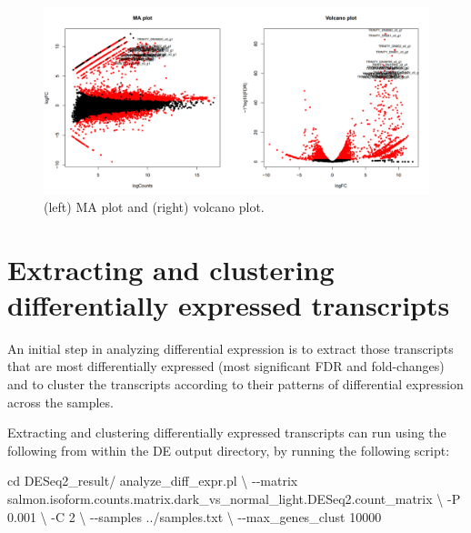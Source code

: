 \documentclass[
  letterpaper,
  DIV=11,
  numbers=noendperiod]{scrreprt}
\newenvironment{Shaded}{\begin{snugshade}}{\end{snugshade}}
\newcommand{\BuiltInTok}[1]{\textcolor[rgb]{0.00,0.23,0.31}{#1}}
\newcommand{\DataTypeTok}[1]{\textcolor[rgb]{0.68,0.00,0.00}{#1}}
\newcommand{\ExtensionTok}[1]{\textcolor[rgb]{0.00,0.23,0.31}{#1}}
\newcommand{\NormalTok}[1]{\textcolor[rgb]{0.00,0.23,0.31}{#1}}
\begin{document}
\begin{figure}

{\centering \includegraphics{assets/35_DE_plots.png}

}

\caption{(left) MA plot and (right) volcano plot.}

\end{figure}

\hypertarget{extracting-and-clustering-differentially-expressed-transcripts}{%
\section{Extracting and clustering differentially expressed
transcripts}\label{extracting-and-clustering-differentially-expressed-transcripts}}

An initial step in analyzing differential expression is to extract those
transcripts that are most differentially expressed (most significant FDR
and fold-changes) and to cluster the transcripts according to their
patterns of differential expression across the samples.

\begin{tcolorbox}[enhanced jigsaw, breakable, bottomrule=.15mm, left=2mm, coltitle=black, opacityback=0, colframe=quarto-callout-note-color-frame, toprule=.15mm, opacitybacktitle=0.6, colbacktitle=quarto-callout-note-color!10!white, bottomtitle=1mm, colback=white, toptitle=1mm, titlerule=0mm, rightrule=.15mm, arc=.35mm, title=\textcolor{quarto-callout-note-color}{\faInfo}\hspace{0.5em}{Activity}, leftrule=.75mm]

Extracting and clustering differentially expressed transcripts can run
using the following from within the DE output directory, by running the
following script:

\begin{Shaded}
\begin{Highlighting}[]
\BuiltInTok{cd}\NormalTok{ DESeq2\_result/}
\ExtensionTok{analyze\_diff\_expr.pl} \DataTypeTok{\textbackslash{}}
\NormalTok{{-}{-}matrix salmon.isoform.counts.matrix.dark\_vs\_normal\_light.DESeq2.count\_matrix }\DataTypeTok{\textbackslash{}}
\NormalTok{{-}P 0.001 }\DataTypeTok{\textbackslash{}}
\NormalTok{{-}C 2 }\DataTypeTok{\textbackslash{}}
\NormalTok{{-}{-}samples ../samples.txt }\DataTypeTok{\textbackslash{}}
\NormalTok{{-}{-}max\_genes\_clust 10000}
\end{Highlighting}
\end{Shaded}

\end{tcolorbox}
\end{document}
